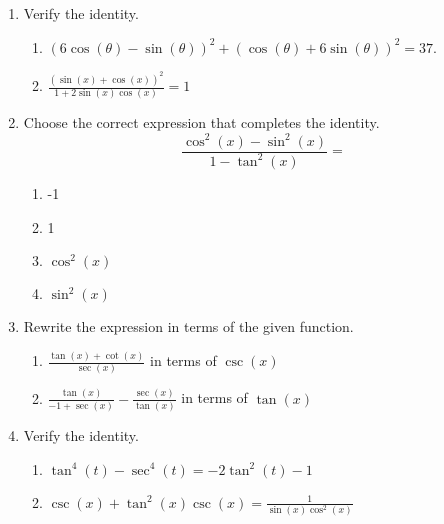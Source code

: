 \begin{enumerate}
\item Verify the identity.

\begin{enumerate}
\item $\left(6\cos(\theta)-\sin(\theta)\right)^2+\left(\cos(\theta)+6\sin(\theta)\right)^2=37$.
\vfill
\item $\displaystyle \frac{(\sin(x)+\cos(x))^2}{1+2\sin(x)\cos(x)}=1$
\vfill
\end{enumerate}

\clearpage

\item Choose the correct expression that completes the identity.
$$\frac{\cos^2(x)-\sin^2(x)}{1-\tan^2(x)}=$$
\begin{enumerate}
\item -1
\item 1
\item $\cos^2(x)$
\item $\sin^2(x)$
\end{enumerate}


\item Rewrite the expression in terms of the given function.
\begin{enumerate}
\item $\displaystyle \frac{\tan(x)+\cot(x)}{\sec(x)}$ in terms of $\csc(x)$
\vfill
\item $\displaystyle \frac{\tan(x)}{-1+\sec(x)}-\frac{\sec(x)}{\tan(x)}$ in terms of $\tan(x)$
\vfill

\end{enumerate}

\clearpage
\item Verify the identity.

\begin{enumerate}
\item $\tan^4(t)-\sec^4(t)=-2\tan^2(t)-1$
\vfill
\item $\displaystyle \csc(x)+\tan^2(x)\csc(x)=\frac{1}{\sin(x)\cos^2(x)}$
\vfill
\end{enumerate}






\end{enumerate}
